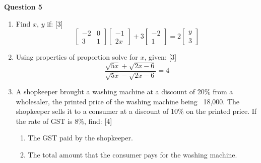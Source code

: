 \noindent
\textbf{Question 5}
\begin{enumerate}[label=(\roman*)]

    \item Find $x$, $y$ if: \hfill [3]
        \[
            \begin{bmatrix*} -2 & 0 \\ 3 & 1 \end{bmatrix*}
            \begin{bmatrix*} -1 \\ 2x \end{bmatrix*} + 
            3\begin{bmatrix*} -2 \\ 1 \end{bmatrix*} = 
            2\begin{bmatrix*} y \\ 3 \end{bmatrix*} 
        \]

    \item Using properties of proportion solve for $x$, given: \hfill [3]
        \[
            \frac{\sqrt{5x} + \sqrt{2x-6}}{\sqrt{5x} - \sqrt{2x-6}} = 4
        \]

    \item A shopkeeper brought a washing machine at a discount of 
        20\% from a wholesaler, the printed price of the washing machine 
        being \rupee~18,000. The shopkeeper sells it to a consumer at a 
        discount of 10\% on the printed price. If the rate of GST is 8\%, find: 
        \hfill [4]

        \begin{enumerate}
            \setlength\itemsep{0em}
            \item The GST paid by the shopkeeper. 
            \item The total amount that the consumer pays for the washing machine.
        \end{enumerate}

\end{enumerate}

